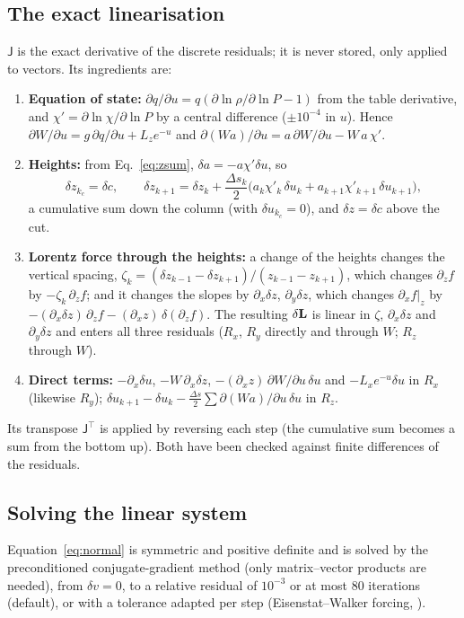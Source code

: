 \subsection{The exact linearisation}\label{sec:lin}
$\mathsf J$ is the exact derivative of the discrete residuals; it is never stored, only applied to vectors. Its ingredients are:
\begin{enumerate}
\item \textbf{Equation of state:} $\partial q/\partial u=q(\partial\ln\rho/\partial\ln P-1)$ from the table derivative, and
$\chi'=\partial\ln\chi/\partial\ln P$ by a central difference ($\pm10^{-4}$ in $u$). Hence
$\partial W/\partial u=g\,\partial q/\partial u+L_ze^{-u}$ and $\partial(Wa)/\partial u=a\,\partial W/\partial u-W\,a\,\chi'$.
\item \textbf{Heights:} from Eq.~\eqref{eq:zsum}, $\delta a=-a\chi'\delta u$, so
\begin{equation}
\delta z_{k_c}=\delta c,\qquad \delta z_{k+1}=\delta z_k+\frac{\Delta s_k}{2}\big(a_k\chi'_k\,\delta u_k+a_{k+1}\chi'_{k+1}\,\delta u_{k+1}\big),
\end{equation}
a cumulative sum down the column (with $\delta u_{k_c}=0$), and $\delta z=\delta c$ above the cut.
\item \textbf{Lorentz force through the heights:} a change of the heights changes the vertical spacing,
$\zeta_k=(\delta z_{k-1}-\delta z_{k+1})/(z_{k-1}-z_{k+1})$, which changes $\partial_zf$ by $-\zeta_k\,\partial_zf$; and it
changes the slopes by $\partial_x\delta z$, $\partial_y\delta z$, which changes $\partial_xf|_z$ by
$-(\partial_x\delta z)\,\partial_zf-(\partial_xz)\,\delta(\partial_zf)$. The resulting $\delta\mathbf L$ is linear in $\zeta$,
$\partial_x\delta z$ and $\partial_y\delta z$ and enters all three residuals ($R_x$, $R_y$ directly and through $W$; $R_z$
through $W$).
\item \textbf{Direct terms:} $-\partial_x\delta u$, $-W\,\partial_x\delta z$, $-(\partial_xz)\,\partial W/\partial u\,\delta u$
and $-L_xe^{-u}\delta u$ in $R_x$ (likewise $R_y$); $\delta u_{k+1}-\delta u_k-\tfrac{\Delta s}{2}\sum\partial(Wa)/\partial u\,\delta
u$ in $R_z$.
\end{enumerate}
Its transpose $\mathsf J^{\!\top}$ is applied by reversing each step (the cumulative sum becomes a sum from the bottom up). Both
have been checked against finite differences of the residuals.

\subsection{Solving the linear system}
Equation~\eqref{eq:normal} is symmetric and positive definite and is solved by the preconditioned conjugate-gradient method
(only matrix--vector products are needed), from $\delta v=0$, to a relative residual of $10^{-3}$ or at most 80 iterations
(default), or with a tolerance adapted per step (Eisenstat--Walker forcing, ).

